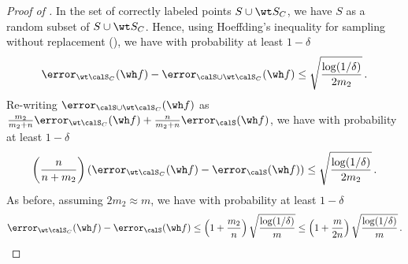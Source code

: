 \begin{proof}[Proof of ]
In the set of correctly labeled points $S \cup \wt S_C$, we have $S$ as a random subset of $S \cup \wt S_C$. Hence, using Hoeffding's inequality for sampling without replacement (), we have with probability at least $1-\delta$
\begin{align}
    \error_{\wt \calS_C} (\wh f)- \error_{\calS \cup \wt \calS_C}( \wh f) \le  \sqrt{\frac{\log(1/\delta)}{2m_2}} \,.
\end{align}
Re-writing $\error_{\calS \cup \wt \calS_C}( \wh f)$ as $\frac{m_2}{m_2 + n} \error_{\wt \calS_C }(\wh f) + \frac{n}{m_2 + n} \error_{\calS }(\wh f)$, we have with probability at least $1-\delta$
\begin{align}
   \left(\frac{n}{n+m_2}\right) \left(\error_{\wt \calS_C} (\wh f)- \error_{\calS}( \wh f) \right) \le  \sqrt{\frac{\log(1/\delta)}{2m_2}} \,.
\end{align}
As before, assuming $2m_2 \approx m$, we have with probability at least $1-\delta$ 
\begin{align}
    \error_{\wt \calS_C} (\wh f)- \error_{\calS}( \wh f) \le \left(1+\frac{m_2}{n}\right)  \sqrt{\frac{\log(1/\delta)}{m}} \le \left(1 + \frac{m}{2n}\right) \sqrt{\frac{\log(1/\delta)}{m}} \,. \label{eq:lemma3_final}
\end{align} 
\end{proof}

